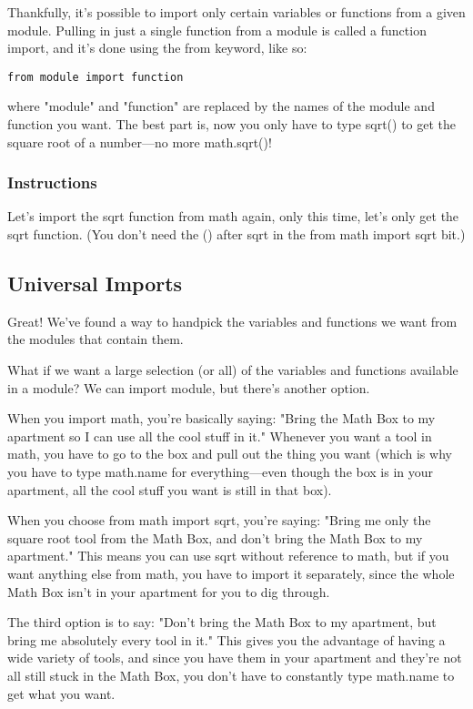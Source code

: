 \documentclass[12pt,a4paper,final,twoside,onecolumn,titlepage]{book}
\begin{document}
Thankfully, it's possible to import only certain variables or functions from a given module. Pulling in just a single function from a module is called a function import, and it's done using the from keyword, like so:
\begin{lstlisting}
from module import function
\end{lstlisting}
where "module" and "function" are replaced by the names of the module and function you want. The best part is, now you only have to type sqrt() to get the square root of a number—no more math.sqrt()!
\subsubsection{Instructions}

Let's import the sqrt function from math again, only this time, let's only get the sqrt function. (You don't need the () after sqrt in the from math import sqrt bit.)

\subsection{Universal Imports}

Great! We've found a way to handpick the variables and functions we want from the modules that contain them.

What if we want a large selection (or all) of the variables and functions available in a module? We can import module, but there's another option.

When you import math, you're basically saying: "Bring the Math Box to my apartment so I can use all the cool stuff in it." Whenever you want a tool in math, you have to go to the box and pull out the thing you want (which is why you have to type math.name for everything—even though the box is in your apartment, all the cool stuff you want is still in that box).

When you choose from math import sqrt, you're saying: "Bring me only the square root tool from the Math Box, and don't bring the Math Box to my apartment." This means you can use sqrt without reference to math, but if you want anything else from math, you have to import it separately, since the whole Math Box isn't in your apartment for you to dig through.

The third option is to say: "Don't bring the Math Box to my apartment, but bring me absolutely every tool in it." This gives you the advantage of having a wide variety of tools, and since you have them in your apartment and they're not all still stuck in the Math Box, you don't have to constantly type math.name to get what you want.
\end{document}
